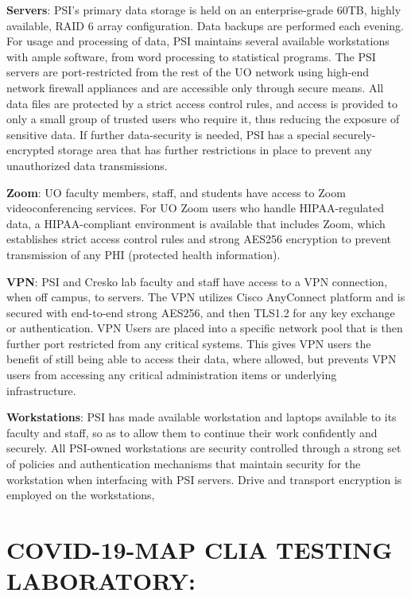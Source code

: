 \documentclass[
]{book}
\begin{document}
\textbf{Servers}: PSI's primary data storage is held on an enterprise-grade 60TB, highly available, RAID 6 array configuration. Data backups are performed each evening. For usage and processing of data, PSI maintains several available workstations with ample software, from word processing to statistical programs. The PSI servers are port-restricted from the rest of the UO network using high-end network firewall appliances and are accessible only through secure means. All data files are protected by a strict access control rules, and access is provided to only a small group of trusted users who require it, thus reducing the exposure of sensitive data. If further data-security is needed, PSI has a special securely-encrypted storage area that has further restrictions in place to prevent any unauthorized data transmissions.

\textbf{Zoom}: UO faculty members, staff, and students have access to Zoom videoconferencing services. For UO Zoom users who handle HIPAA-regulated data, a HIPAA-compliant environment is available that includes Zoom, which establishes strict access control rules and strong AES256 encryption to prevent transmission of any PHI (protected health information).

\textbf{VPN}: PSI and Cresko lab faculty and staff have access to a VPN connection, when off campus, to servers. The VPN utilizes Cisco AnyConnect platform and is secured with end-to-end strong AES256, and then TLS1.2 for any key exchange or authentication. VPN Users are placed into a specific network pool that is then further port restricted from any critical systems. This gives VPN users the benefit of still being able to access their data, where allowed, but prevents VPN users from accessing any critical administration items or underlying infrastructure.

\textbf{Workstations}: PSI has made available workstation and laptops available to its faculty and staff, so as to allow them to continue their work confidently and securely. All PSI-owned workstations are security controlled through a strong set of policies and authentication mechanisms that maintain security for the workstation when interfacing with PSI servers. Drive and transport encryption is employed on the workstations,

\hypertarget{covid-19-map-clia-testing-laboratory}{%
\section{COVID-19-MAP CLIA TESTING LABORATORY:}\label{covid-19-map-clia-testing-laboratory}}
\end{document}
